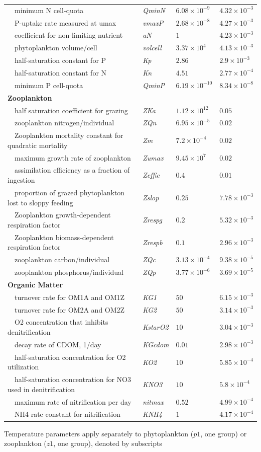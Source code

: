 \documentclass[review]{elsarticle}\usepackage[]{graphicx}\usepackage[]{color}
\begin{document}
\begin{table}[!tbp]
{\begin{center}
\begin{tabular}{llll}
~~minimum N cell-quota&\textit{QminN}&$6.08\times 10^{-9}$&$4.32\times 10^{-3}$\tabularnewline
~~P-uptake rate measured at umax&\textit{vmaxP}&$2.68\times 10^{-8}$&$4.27\times 10^{-3}$\tabularnewline
~~coefficient for non-limiting nutrient&\textit{aN}&$1$&$4.23\times 10^{-3}$\tabularnewline
~~phytoplankton volume/cell&\textit{volcell}&$3.37\times 10^{4}$&$4.13\times 10^{-3}$\tabularnewline
~~half-saturation constant for P&\textit{Kp}&$2.86$&$2.9\times 10^{-3}$\tabularnewline
~~half-saturation constant for N&\textit{Kn}&$4.51$&$2.77\times 10^{-4}$\tabularnewline
~~minimum P cell-quota&\textit{QminP}&$6.19\times 10^{-10}$&$8.34\times 10^{-8}$\tabularnewline
\hline
{\bfseries Zooplankton}&&&\tabularnewline
~~half saturation coefficient for grazing&\textit{ZKa}&$1.12\times 10^{12}$&$0.05$\tabularnewline
~~zooplankton nitrogen/individual&\textit{ZQn}&$6.95\times 10^{-5}$&$0.02$\tabularnewline
~~Zooplankton mortality constant for quadratic mortality&\textit{Zm}&$7.2\times 10^{-4}$&$0.02$\tabularnewline
~~maximum growth rate of zooplankton&\textit{Zumax}&$9.45\times 10^{7}$&$0.02$\tabularnewline
~~assimilation efficiency as a fraction of ingestion&\textit{Zeffic}&$0.4$&$0.01$\tabularnewline
~~proportion of grazed phytoplankton lost to sloppy feeding&\textit{Zslop}&$0.25$&$7.78\times 10^{-3}$\tabularnewline
~~Zooplankton growth-dependent respiration factor&\textit{Zrespg}&$0.2$&$5.32\times 10^{-3}$\tabularnewline
~~Zooplankton biomass-dependent respiration factor&\textit{Zrespb}&$0.1$&$2.96\times 10^{-3}$\tabularnewline
~~zooplankton carbon/individual&\textit{ZQc}&$3.13\times 10^{-4}$&$9.38\times 10^{-5}$\tabularnewline
~~zooplankton phosphorus/individual&\textit{ZQp}&$3.77\times 10^{-6}$&$3.69\times 10^{-5}$\tabularnewline
\hline
{\bfseries Organic Matter}&&&\tabularnewline
~~turnover rate for OM1A and OM1Z&\textit{KG1}&$50$&$6.15\times 10^{-3}$\tabularnewline
~~turnover rate for OM2A and OM2Z&\textit{KG2}&$50$&$3.14\times 10^{-3}$\tabularnewline
~~O2 concentration that inhibits denitrification&\textit{KstarO2}&$10$&$3.04\times 10^{-3}$\tabularnewline
~~decay rate of CDOM, 1/day&\textit{KGcdom}&$0.01$&$2.98\times 10^{-3}$\tabularnewline
~~half-saturation concentration for O2 utilization&\textit{KO2}&$10$&$5.85\times 10^{-4}$\tabularnewline
~~half-saturation concentration for NO3 used in denitrification&\textit{KNO3}&$10$&$5.8\times 10^{-4}$\tabularnewline
~~maximum rate of nitrification per day&\textit{nitmax}&$0.52$&$4.99\times 10^{-4}$\tabularnewline
~~NH4 rate constant for nitrification&\textit{KNH4}&$1$&$4.17\times 10^{-4}$\tabularnewline
\hline
\end{tabular}\end{center}}
\footnotesize *Temperature parameters apply separately to phytoplankton ($p1$, one group) or zooplankton ($z1$, one group), denoted by subscripts\end{table}
\end{document}
